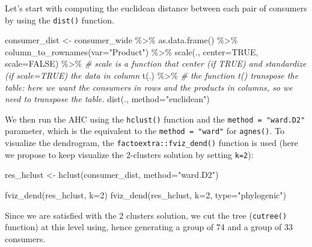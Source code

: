 \documentclass[
]{book}
\newenvironment{Shaded}{\begin{snugshade}}{\end{snugshade}}
\newcommand{\AttributeTok}[1]{\textcolor[rgb]{0.77,0.63,0.00}{#1}}
\newcommand{\CommentTok}[1]{\textcolor[rgb]{0.56,0.35,0.01}{\textit{#1}}}
\newcommand{\ConstantTok}[1]{\textcolor[rgb]{0.00,0.00,0.00}{#1}}
\newcommand{\DecValTok}[1]{\textcolor[rgb]{0.00,0.00,0.81}{#1}}
\newcommand{\FunctionTok}[1]{\textcolor[rgb]{0.00,0.00,0.00}{#1}}
\newcommand{\NormalTok}[1]{#1}
\newcommand{\OtherTok}[1]{\textcolor[rgb]{0.56,0.35,0.01}{#1}}
\newcommand{\SpecialCharTok}[1]{\textcolor[rgb]{0.00,0.00,0.00}{#1}}
\newcommand{\StringTok}[1]{\textcolor[rgb]{0.31,0.60,0.02}{#1}}
\begin{document}
Let's start with computing the euclidean distance between each pair of consumers by using the \texttt{dist()} function.

\begin{Shaded}
\begin{Highlighting}[]
\NormalTok{consumer\_dist }\OtherTok{\textless{}{-}}\NormalTok{ consumer\_wide }\SpecialCharTok{\%\textgreater{}\%} 
  \FunctionTok{as.data.frame}\NormalTok{() }\SpecialCharTok{\%\textgreater{}\%} 
  \FunctionTok{column\_to\_rownames}\NormalTok{(}\AttributeTok{var=}\StringTok{"Product"}\NormalTok{) }\SpecialCharTok{\%\textgreater{}\%} 
  \FunctionTok{scale}\NormalTok{(., }\AttributeTok{center=}\ConstantTok{TRUE}\NormalTok{, }\AttributeTok{scale=}\ConstantTok{FALSE}\NormalTok{) }\SpecialCharTok{\%\textgreater{}\%} \CommentTok{\# scale is a function that center (if TRUE) and standardize (if scale=TRUE) the data in column}
  \FunctionTok{t}\NormalTok{(.) }\SpecialCharTok{\%\textgreater{}\%} \CommentTok{\# the function t() transpose the table: here we want the consumers in rows and the products in columns, so we need to transpose the table.}
  \FunctionTok{dist}\NormalTok{(., }\AttributeTok{method=}\StringTok{"euclidean"}\NormalTok{)}
\end{Highlighting}
\end{Shaded}

We then run the AHC using the \texttt{hclust()} function and the \texttt{method\ =\ "ward.D2"} parameter, which is the equivalent to the \texttt{method\ =\ "ward"} for \texttt{agnes()}. To visualize the dendrogram, the \texttt{factoextra::fviz\_dend()} function is used (here we propose to keep visualize the 2-clusters solution by setting \texttt{k=2}):

\begin{Shaded}
\begin{Highlighting}[]
\NormalTok{res\_hclust }\OtherTok{\textless{}{-}} \FunctionTok{hclust}\NormalTok{(consumer\_dist, }\AttributeTok{method=}\StringTok{"ward.D2"}\NormalTok{)}

\FunctionTok{fviz\_dend}\NormalTok{(res\_hclust, }\AttributeTok{k=}\DecValTok{2}\NormalTok{)}
\FunctionTok{fviz\_dend}\NormalTok{(res\_hclust, }\AttributeTok{k=}\DecValTok{2}\NormalTok{, }\AttributeTok{type=}\StringTok{"phylogenic"}\NormalTok{)}
\end{Highlighting}
\end{Shaded}

Since we are satisfied with the 2 clusters solution, we cut the tree (\texttt{cutree()} function) at this level using, hence generating a group of 74 and a group of 33 consumers.
\end{document}
